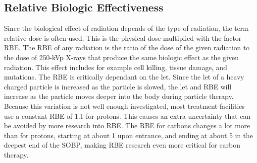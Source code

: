 \documentclass[../main/thesis.tex]{subfiles}
\begin{document}
\subsection{Relative Biologic Effectiveness}
\label{t-rbe}

Since the biological effect of radiation depends of the type of radiation, the term relative dose is often used. This is the physical dose multiplied with the factor \gls{RBE}. The \gls{RBE} of any radiation is the ratio of the dose of the given radiation to the dose of 250-kVp X-rays that produce the same biologic effect as the given radiation. This effect includes for example cell killing, tissue damage, and mutations. The \gls{RBE} is critically dependant on the \gls{let}. Since the \gls{let} of a heavy charged particle is increased as the particle is slowed, the \gls{let} and \gls{RBE} will increase as the particle moves deeper into the body during particle therapy. Because this variation is not well enough investigated, most treatment facilities use a constant \gls{RBE} of 1.1 for protons. This causes an extra uncertainty that can be avoided by more research into \gls{RBE}. The \gls{RBE} for carbons changes a lot more than for protons, starting at about 1 upon entrance, and ending at about 5 in the deepest end of the \gls{SOBP}, making \gls{RBE} research even more critical for carbon therapy. \citep[chap. 27]{Khan} \citep{ksyh-phys251}
\end{document}
